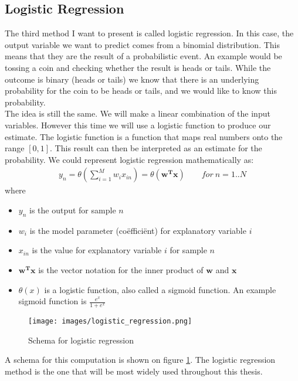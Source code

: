 \subsection{Logistic Regression}
The third method I want to present is called logistic regression\cite{caltechmachinelearning}\cite{wikilogistic}. In this case, the output variable we want to predict comes from a binomial distribution. This means that they are the result of a probabilistic event. An example would be tossing a coin and checking whether the result is heads or tails. While the outcome is binary (heads or tails) we know that there is an underlying probability for the coin to be heads or tails, and we would like to know this probability. \\
The idea is still the same. We will make a linear combination of the input variables. However this time we will use a logistic function to produce our estimate. The logistic function is a function that maps real numbers onto the range $[0,1]$. This result can then be interpreted as an estimate for the probability. We could represent logistic regression mathematically as:
\begin{equation}
\begin{split}
y_{n} = \theta(\sum_{i=1}^{M}w_{i}x_{in})= \theta(\bm{w^{T}x}) \qquad for\ n=1..N
\end{split}
\end{equation}
where
\begin{itemize}
	\item $y_{n}$ is the output for sample $n$
	\item $w_{i}$ is the model parameter (co\"effici\"ent) for explanatory variable $i$
	\item $x_{in}$ is the value for explanatory variable $i$ for sample $n$
	\item $\bm{w^{T}x}$ is the vector notation for the inner product of $\bm{w}$ and $\bm{x}$
	\item $\theta(x)$ is a logistic function, also called a sigmoid function. An example sigmoid function is $\frac{e^{x}}{1+e^{x}}$
\end{itemize}
\begin{figure}
	\centering
	\texttt{[image: images/logistic\_regression.png]}
	\caption{Schema for logistic regression}
	\label{fig:glm-logistic-regression}
\end{figure}
A schema for this computation is shown on figure \ref{fig:glm-logistic-regression}.
The logistic regression method is the one that will be most widely used throughout this thesis.

